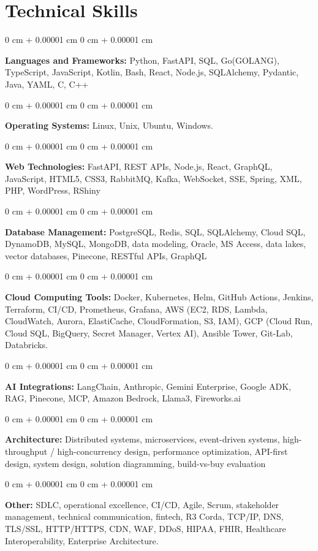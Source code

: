 \documentclass[10pt, letterpaper]{article}
\newenvironment{onecolentry}{
    \begin{adjustwidth}{
        0 cm + 0.00001 cm
    }{
        0 cm + 0.00001 cm
    }
}{
    \end{adjustwidth}
} %
\begin{document}
    \section{Technical Skills}
    \vspace{2 pt }
    \begin{onecolentry}
    \textbf{Languages and Frameworks:} Python, FastAPI, SQL, Go(GOLANG), TypeScript, JavaScript, Kotlin, Bash, React, Node.js, SQLAlchemy, Pydantic, Java, YAML, C, C++
    \end{onecolentry}
    \begin{onecolentry}
        \textbf{Operating Systems:} Linux, Unix, Ubuntu, Windows.
    \end{onecolentry}
    \begin{onecolentry}
         \textbf{Web Technologies:} FastAPI, REST APIs, Node.js, React, GraphQL, JavaScript, HTML5, CSS3, RabbitMQ, Kafka, WebSocket, SSE, Spring, XML, PHP, WordPress, RShiny
    \end{onecolentry}
    \begin{onecolentry}
        \textbf{Database Management:} PostgreSQL, Redis, SQL, SQLAlchemy, Cloud SQL, DynamoDB, MySQL, MongoDB, data modeling, Oracle, MS Access, data lakes, vector databases, Pinecone, RESTful APIs, GraphQL
    \end{onecolentry}
    \begin{onecolentry}
        \textbf{Cloud Computing Tools:}
Docker, Kubernetes, Helm, GitHub Actions, Jenkins, Terraform, CI/CD, Prometheus, Grafana, AWS (EC2, RDS, Lambda, CloudWatch, Aurora, ElastiCache, CloudFormation, S3, IAM), GCP (Cloud Run, Cloud SQL, BigQuery, Secret Manager, Vertex AI), Ansible Tower, Git-Lab, Databricks.
    \end{onecolentry}
    \begin{onecolentry}
         \textbf{AI Integrations:} LangChain, Anthropic, Gemini Enterprise, Google ADK, RAG, Pinecone, MCP, Amazon Bedrock, Llama3, Fireworks.ai
    \end{onecolentry}
    \begin{onecolentry}
        \textbf{Architecture:} Distributed systems, microservices, event-driven systems, high-throughput / high-concurrency design, performance optimization, API-first design, system design, solution diagramming, build-vs-buy evaluation
    \end{onecolentry}
        \begin{onecolentry}
     \textbf{Other:} SDLC, operational excellence, CI/CD, Agile, Scrum, stakeholder management, technical communication, fintech, R3 Corda, TCP/IP, DNS, TLS/SSL, HTTP/HTTPS, CDN, WAF, DDoS, HIPAA, FHIR, Healthcare Interoperability, Enterprise Architecture.
    \end{onecolentry}
\end{document}
